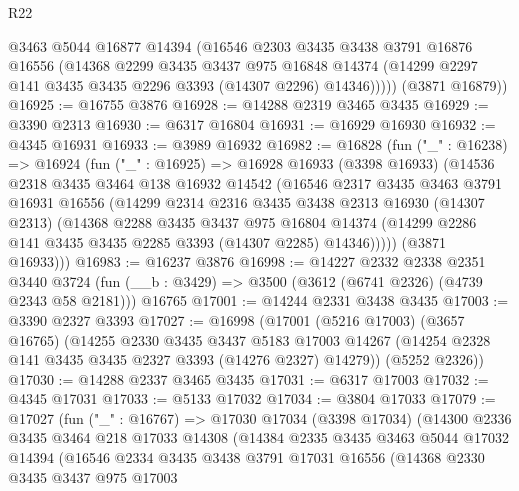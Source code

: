 \begin{lexlean}{R22}
\begin{coremodule}
          @3463
          @5044
          @16877
          @14394
          (@16546
            @2303
            @3435
            @3438
            @3791
            @16876
            @16556
            (@14368
              @2299
              @3435
              @3437
              @975
              @16848
              @14374
              (@14299 @2297 @141 @3435 @3435 @2296 @3393 (@14307 @2296) @14346)))))
      (@3871 @16879))
@16925 := @16755 @3876
@16928 := @14288 @2319 @3465 @3435
@16929 := @3390 @2313
@16930 := @6317 @16804
@16931 := @16929 @16930
@16932 := @4345 @16931
@16933 := @3989 @16932
@16982 := @16828
    (fun ("_" : @16238) =>
    @16924
      (fun ("_" : @16925) =>
      @16928
        @16933
        (@3398 @16933)
        (@14536
          @2318
          @3435
          @3464
          @138
          @16932
          @14542
          (@16546
            @2317
            @3435
            @3463
            @3791
            @16931
            @16556
            (@14299
              @2314
              @2316
              @3435
              @3438
              @2313
              @16930
              (@14307 @2313)
              (@14368
                @2288
                @3435
                @3437
                @975
                @16804
                @14374
                (@14299 @2286 @141 @3435 @3435 @2285 @3393 (@14307 @2285) @14346)))))
        (@3871 @16933)))
@16983 := @16237 @3876
@16998 := @14227
    @2332
    @2338
    @2351
    @3440
    @3724
    (fun (__b : @3429) => @3500 (@3612 (@6741 @2326) (@4739 @2343 @58 @2181)))
    @16765
@17001 := @14244 @2331 @3438 @3435
@17003 := @3390 @2327 @3393
@17027 := @16998
    (@17001
      (@5216 @17003)
      (@3657 @16765)
      (@14255
        @2330
        @3435
        @3437
        @5183
        @17003
        @14267
        (@14254 @2328 @141 @3435 @3435 @2327 @3393 (@14276 @2327) @14279))
      (@5252 @2326))
@17030 := @14288 @2337 @3465 @3435
@17031 := @6317 @17003
@17032 := @4345 @17031
@17033 := @5133 @17032
@17034 := @3804 @17033
@17079 := @17027
    (fun ("_" : @16767) =>
    @17030
      @17034
      (@3398 @17034)
      (@14300
        @2336
        @3435
        @3464
        @218
        @17033
        @14308
        (@14384
          @2335
          @3435
          @3463
          @5044
          @17032
          @14394
          (@16546
            @2334
            @3435
            @3438
            @3791
            @17031
            @16556
            (@14368
              @2330
              @3435
              @3437
              @975
              @17003

\end{coremodule}
\end{lexlean}
